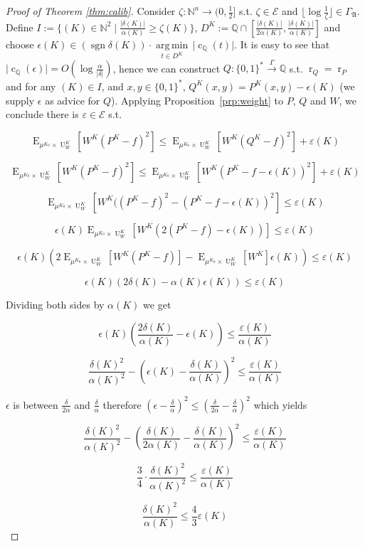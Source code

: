 \documentclass{article}
\numberwithin{equation}{section}
\theoremstyle{definition}
\theoremstyle{plain}
\newcommand{\Bool}{\{0,1\}}
\newcommand{\Words}{{\Bool^*}}
\DeclareMathOperator{\Sgn}{sgn}
\DeclareMathOperator{\E}{E}
\DeclareMathOperator{\R}{r}
\DeclareMathOperator{\Un}{U}
\DeclareMathOperator{\En}{c}
\newcommand{\Argmin}[1]{\underset{#1}{\operatorname{arg\,min}}\,}
\newcommand{\Nats}{\mathbb{N}}
\newcommand{\Rats}{\mathbb{Q}}
\newcommand{\Abs}[1]{\lvert #1 \rvert}
\newcommand{\Floor}[1]{\lfloor #1 \rfloor}
\newcommand{\GrowA}{\Gamma_{\mathfrak{A}}}
\newcommand{\Fall}{\mathcal{E}}
\newcommand{\Scheme}{\xrightarrow{\Gamma}}
\begin{document}
\begin{proof}[Proof of Theorem \ref{thm:calib}]

Consider $\zeta: \Nats^n \rightarrow (0,\frac{1}{2}]$ s.t.  $\zeta \in \Fall$ and $\Floor{\log \frac{1}{\zeta}} \in \GrowA$. Define $I:=\{(K) \in \Nats^2 \mid \frac{\Abs{\delta(K)}}{\alpha(K)} \geq \zeta(K)\}$, $D^{K}:=\Rats \cap [\frac{\Abs{\delta(K)}}{2\alpha(K)},\frac{\Abs{\delta(K)}}{\alpha(K)}]$ and choose ${\epsilon(K) \in (\Sgn \delta(K)) \cdot \Argmin{t \in D^{K}} \Abs{\En_\Rats(t)}}$. It is easy to see that ${\Abs{\En_\Rats(\epsilon)} = O(\log \frac{\alpha}{\Abs{\delta}})}$, hence we can construct $Q: \Words \Scheme \Rats$ s.t. $\R_Q=\R_P$ and for any $(K) \in I$, and $x,y \in \Words$, $Q^{K}(x,y)=P^{K}(x,y)-\epsilon(K)$ (we supply $\epsilon$ as advice for $Q$). Applying Proposition~\ref{prp:weight} to $P$, $Q$ and $W$, we conclude there is $\varepsilon \in \Fall$ s.t.

$$\E_{\mu^{K_0} \times \Un_W^{K}}[W^{K}(P^{K} - f)^2] \leq \E_{\mu^{K_0} \times \Un_W^{K}}[W^{K}(Q^{K}-f)^2] + \varepsilon(K)$$

$$\E_{\mu^{K_0} \times \Un_W^{K}}[W^{K}(P^{K} - f)^2] \leq \E_{\mu^{K_0} \times \Un_W^{K}}[W^{K}(P^{K}-f-\epsilon(K))^2] + \varepsilon(K)$$

$$\E_{\mu^{K_0} \times \Un_W^{K}}[W^{K}((P^{K} - f)^2 - (P^{K}-f-\epsilon(K))^2] \leq \varepsilon(K)$$

$$ \epsilon(K) \E_{\mu^{K_0} \times \Un_W^{K}}[W^{K}(2(P^{K} - f) - \epsilon(K))] \leq \varepsilon(K)$$

$$ \epsilon(K) (2 \E_{\mu^{K_0} \times \Un_W^{K}}[W^{K}(P^{K} - f)]-\E_{\mu^{K_0} \times \Un_W^{K}}[W^{K}]\epsilon(K)) \leq \varepsilon(K)$$

$$ \epsilon(K) (2 \delta(K) - \alpha(K)\epsilon(K)) \leq \varepsilon(K)$$

Dividing both sides by $ \alpha(K)$ we get

$$\epsilon(K) (\frac{2\delta(K)}{\alpha(K)} - \epsilon(K)) \leq \frac{\varepsilon(K)}{\alpha(K)}$$

$$\frac{\delta(K)^2}{\alpha(K)^2}-(\epsilon(K) - \frac{\delta(K)}{\alpha(K)})^2 \leq \frac{\varepsilon(K)}{\alpha(K)}$$

$\epsilon$ is between $\frac{\delta}{2\alpha}$ and $\frac{\delta}{\alpha}$ therefore $(\epsilon-\frac{\delta}{\alpha})^2 \leq (\frac{\delta}{2\alpha} - \frac{\delta}{\alpha})^2$  which yields

$$\frac{\delta(K)^2}{\alpha(K)^2}-(\frac{\delta(K)}{2\alpha(K)} - \frac{\delta(K)}{\alpha(K)})^2 \leq \frac{\varepsilon(K)}{\alpha(K)}$$

$$\frac{3}{4} \cdot \frac{\delta(K)^2}{\alpha(K)^2} \leq \frac{\varepsilon(K)}{\alpha(K)}$$

$$\frac{\delta(K)^2}{\alpha(K)} \leq \frac{4}{3}\varepsilon(K)$$
\end{proof}
\end{document}
